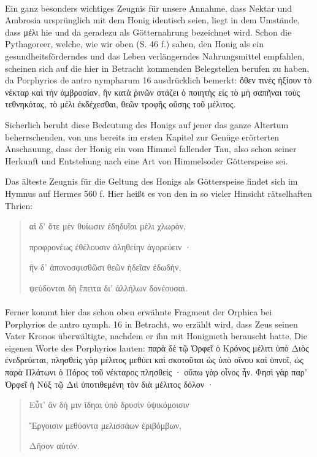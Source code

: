 \documentclass[a4paper, 11pt, oneside]{article}
\begin{document}
\paragraph{}
Ein ganz besonders wichtiges Zeugnis für unsere Annahme, dass Nektar und Ambrosia ursprünglich mit dem Honig identisch seien, liegt in dem Umstände, dass μέλι hie und da geradezu als Götternahrung bezeichnet wird. Schon die Pythagoreer, welche, wie wir oben (S. 46 f.) sahen, den Honig als ein gesundheitsförderndes und das Leben verlängerndes Nahrungsmittel empfahlen, scheinen sich auf die hier in Betracht kommenden Belegstellen berufen zu haben, da Porphyrios de antro nympharum 16 ausdrücklich bemerkt: ὅθεν τινὲς ἠξίουν τὸ νέκταρ καὶ τὴν ἀμβροσίαν, ἣν κατὰ ῥινῶν στάζει ὁ ποιητὴς εἰς τὸ μὴ σαπῆναι τοὺς τεθνηκότας, τὸ μέλι ἐκδέχεσθαι, θεῶν τροφῆς οὔσης τοῦ μέλιτος.

Sicherlich beruht diese Bedeutung des Honigs auf jener das ganze Altertum beherrschenden, von uns bereits im ersten Kapitel zur Genüge erörterten Anschauung, dass der Honig ein vom Himmel fallender Tau, also schon seiner Herkunft und Entstehung nach eine Art von Himmelsoder Götterspeise sei.

Das älteste Zeugnis für die Geltung des Honigs als Götterspeise findet sich im Hymnus auf Hermes 560 f. Hier heißt es von den in so vieler Hinsicht rätselhaften Thrien:
\begin{quotation}
αἱ δ' ὅτε μὲν θυίωσιν ἐδηδυῖαι μέλι χλωρὸν,

προφρονέως ἐθέλουσιν ἀληθείην ἀγορεύειν ·

ἣν δ' ἀπονοσφισθῶσι θεῶν ἡδεῖαν ἐδωδὴν,

ψεύδονται δὴ ἔπειτα δι' ἀλλήλων δονέουσαι.
\end{quotation}
\paragraph{}
Ferner kommt hier das schon oben erwähnte Fragment der Orphica bei Porphyrios de antro nymph. 16 in Betracht, wo erzählt wird, dass Zeus seinen Vater Kronos überwältigte, nachdem er ihn mit Honigmeth berauscht hatte. Die eigenen Worte des Porphyrios lauten: παρὰ δὲ τῷ Ὀρφεῖ ὁ Κρόνος μέλιτι ὑπὸ Διὸς ἐνεδρεύεται, πλησθεὶς γὰρ μέλιτος μεθύει καὶ σκοτοῦται ὡς ὑπὸ οἴνου καὶ ὑπνοῖ, ὡς παρὰ Πλάτωνι ὁ Πόρος τοῦ νέκταρος πλησθείς · οὔπω γὰρ οἷνος ἦν. Φησὶ γὰρ παρ' Ὀρφεῖ ἡ Νύξ τῷ Διὶ ὑποτιθεμένη τὸν διὰ μέλιτος δόλον ·
\begin{quotation}
Εὖτ' ἂν δή μιν ἴδηαι ὑπὸ δρυσὶν ὑψικόμοισιν

Ἔργοισιν μεθύοντα μελισσάων ἐριβόμβων,

Δῆσον αὐτόν.
\end{quotation}
\end{document}
